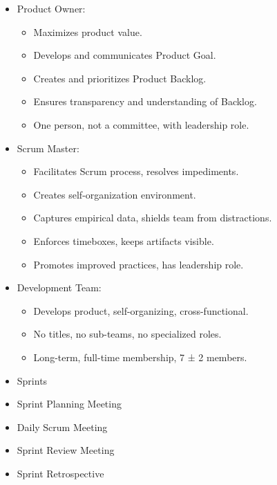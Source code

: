 \documentclass[10pt]{article}
\begin{document}
\begin{multicols}{5}
\begin{block}
    \begin{itemize}
        \item Product Owner:
        \begin{itemize}
            \item Maximizes product value.
            \item Develops and communicates Product Goal.
            \item Creates and prioritizes Product Backlog.
            \item Ensures transparency and understanding of Backlog.
            \item One person, not a committee, with leadership role.
        \end{itemize}
        \item Scrum Master:
        \begin{itemize}
            \item Facilitates Scrum process, resolves impediments.
            \item Creates self-organization environment.
            \item Captures empirical data, shields team from distractions.
            \item Enforces timeboxes, keeps artifacts visible.
            \item Promotes improved practices, has leadership role.
        \end{itemize}
        \item Development Team:
        \begin{itemize}
            \item Develops product, self-organizing, cross-functional.
            \item No titles, no sub-teams, no specialized roles.
            \item Long-term, full-time membership, 7 ± 2 members.
        \end{itemize}
    \end{itemize}
\end{block}

\begin{block}
    \begin{itemize}
        \item Sprints
        \item Sprint Planning Meeting
        \item Daily Scrum Meeting
        \item Sprint Review Meeting
        \item Sprint Retrospective
    \end{itemize}
\end{block}


\end{multicols}
\end{document}
